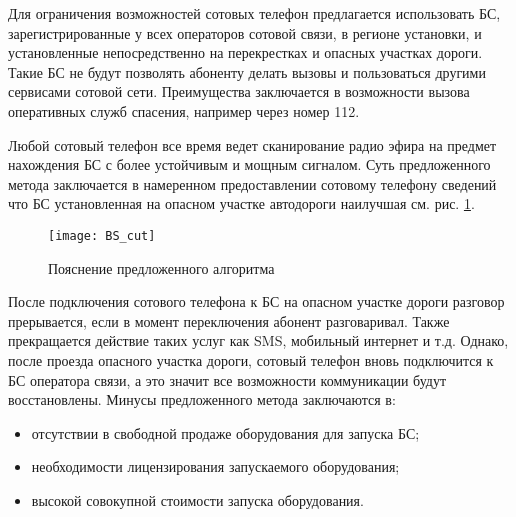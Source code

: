 
Для ограничения возможностей сотовых телефон предлагается использовать БС, зарегистрированные у всех операторов сотовой связи, в регионе установки, и установленные непосредственно на перекрестках и опасных участках дороги. Такие БС не будут позволять абоненту делать вызовы и пользоваться другими сервисами сотовой сети.
Преимущества заключается в возможности вызова оперативных служб спасения, например через номер 112.

Любой сотовый телефон все время ведет сканирование радио эфира на предмет нахождения БС с более устойчивым и мощным сигналом. Суть предложенного метода заключается в намеренном предоставлении сотовому телефону сведений что БС установленная на опасном участке автодороги наилучшая см. рис. \ref{fig:BS}.

\begin{figure}[ht]
	\centering
	\texttt{[image: BS\_cut]}
	\caption{Пояснение предложенного алгоритма}
	\label{fig:BS}
\end{figure}

После подключения сотового телефона к БС на опасном участке дороги разговор прерывается, если в момент переключения абонент разговаривал. Также прекращается действие таких услуг как SMS, мобильный интернет и т.д. Однако, после проезда опасного участка дороги, сотовый телефон вновь подключится к БС оператора связи, а это значит все возможности коммуникации будут восстановлены. Минусы предложенного метода заключаются в:
\begin{itemize}
	\item отсутствии в свободной продаже оборудования для запуска БС;
	\item необходимости лицензирования запускаемого оборудования;
	\item высокой совокупной стоимости запуска оборудования.
\end{itemize}

